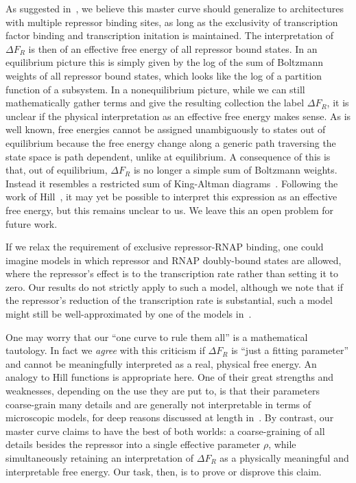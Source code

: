 As suggested in~\cite{Chure2019}, we believe this master curve should generalize
to architectures with multiple repressor binding sites, as long as the
exclusivity of transcription factor binding and transcription initation is
maintained. The interpretation of $\Delta F_R$ is then of an effective free
energy of all repressor bound states. In an equilibrium picture this is simply
given by the log of the sum of Boltzmann weights of all repressor bound states,
which looks like the log of a partition function of a subsystem. In a
nonequilibrium picture, while we can still mathematically gather terms and give
the resulting collection the label $\Delta F_R$, it is unclear if the physical
interpretation as an effective free energy makes sense. As is well known, free
energies cannot be assigned unambiguously to states out of equilibrium because
the free energy change along a generic path traversing the state space is path
dependent, unlike at equilibrium. A consequence of this is that, out of
equilibrium, $\Delta F_R$ is no longer a simple sum of Boltzmann weights.
Instead it resembles a restricted sum of King-Altman diagrams~\cite{King1956,
Hill1966}. Following the work of Hill~\cite{Hill1989}, it may yet be possible to
interpret this expression as an effective free energy, but this remains unclear
to us. We leave this an open problem for future work.

If we relax the requirement of exclusive repressor-RNAP binding, one could
imagine models in which repressor and RNAP doubly-bound states are allowed,
where the repressor's effect is to  the transcription rate rather
than setting it to zero. Our results do not strictly apply to such a model,
although we note that if the repressor's reduction of the transcription rate is
substantial, such a model might still be well-approximated by one of the models
in~.

One may worry that our ``one curve to rule them all'' is a mathematical
tautology. In fact we \textit{agree} with this criticism if $\Delta F_R$ is
``just a fitting parameter'' and cannot be meaningfully interpreted as a real,
physical free energy. An analogy to Hill functions is appropriate here. One of
their great strengths and weaknesses, depending on the use they are put to, is
that their parameters coarse-grain many details and are generally not
interpretable in terms of microscopic models, for deep reasons discussed at
length in~\cite{Frank2013}. By contrast, our master curve claims to have the
best of both worlds: a coarse-graining of all details besides the repressor into
a single effective parameter $\rho$, while simultaneously retaining an
interpretation of $\Delta F_R$ as a physically meaningful and interpretable free
energy. Our task, then, is to prove or disprove this claim.

